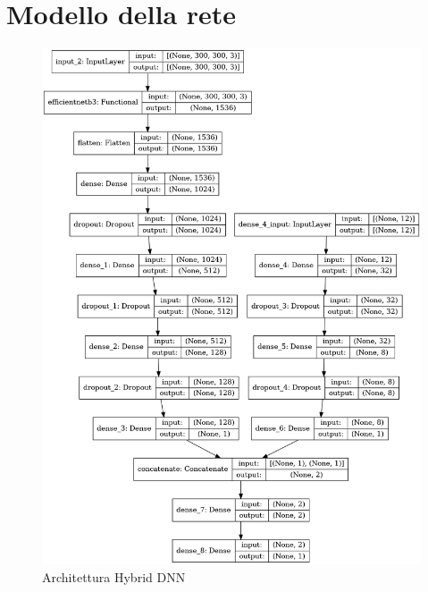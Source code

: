 \section{Modello della rete}
\begin{figure}[H]
    \centering
    \includegraphics[scale=0.33]{Plot/Model-Plot.png}
    \caption{Architettura Hybrid DNN}
    \label{fig:model}
\end{figure}

